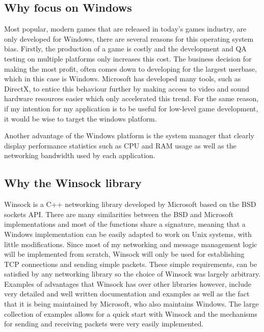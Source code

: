 \subsection{Why focus on Windows}
Most popular, modern games that are released in today's games industry, are only developed for Windows, there are several reasons for this operating system bias. Firstly, the production of a game is costly and the development and QA testing on multiple platforms only increases this cost. The business decision for making the most profit, often comes down to developing for the largest userbase, which in this case is Windows. Microsoft has developed many tools, such as DirectX, to entice this behaviour further by making access to video and sound hardware resources easier which only accelerated this trend.
For the same reason, if my intention for my application is to be useful for low-level game development, it would be wise to target the windows platform.

Another advantage of the Windows platform is the system manager that clearly display performance statistics such as CPU and RAM usage as well as the networking bandwidth used by each application.


\subsection{Why the Winsock library}
Winsock is a C++ networking library developed by Microsoft based on the BSD sockets API. There are many similarities between the BSD and Microsoft implementations and most of the functions share a signature, meaning that a Windows implementation can be easily adapted to work on Unix systems, with little modifications. Since most of my networking and message management logic will be implemented from scratch, Winsock will only be used for establishing TCP connections and sending simple packets. These simple requirements, can be satisfied by any networking library so the choice of Winsock was largely arbitrary. Examples of advantages that Winsock has over other libraries however, include very detailed and well written documentation and examples as well as the fact that it is being maintained by Microsoft, who also maintains Windows. The large collection of examples allows for a quick start with Winsock and the mechanisms for sending and receiving packets were very easily implemented.


\newpage
